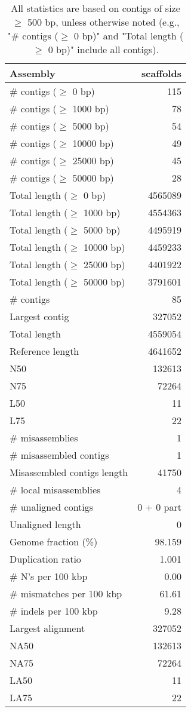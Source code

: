 \documentclass[12pt,a4paper]{article}
\begin{document}
\begin{table}[ht]
\begin{center}
\caption{All statistics are based on contigs of size $\geq$ 500 bp, unless otherwise noted (e.g., "\# contigs ($\geq$ 0 bp)" and "Total length ($\geq$ 0 bp)" include all contigs).}
\begin{tabular}{|l*{1}{|r}|}
\hline
Assembly & scaffolds \\ \hline
\# contigs ($\geq$ 0 bp) & 115 \\ \hline
\# contigs ($\geq$ 1000 bp) & 78 \\ \hline
\# contigs ($\geq$ 5000 bp) & 54 \\ \hline
\# contigs ($\geq$ 10000 bp) & 49 \\ \hline
\# contigs ($\geq$ 25000 bp) & 45 \\ \hline
\# contigs ($\geq$ 50000 bp) & 28 \\ \hline
Total length ($\geq$ 0 bp) & 4565089 \\ \hline
Total length ($\geq$ 1000 bp) & 4554363 \\ \hline
Total length ($\geq$ 5000 bp) & 4495919 \\ \hline
Total length ($\geq$ 10000 bp) & 4459233 \\ \hline
Total length ($\geq$ 25000 bp) & 4401922 \\ \hline
Total length ($\geq$ 50000 bp) & 3791601 \\ \hline
\# contigs & 85 \\ \hline
Largest contig & 327052 \\ \hline
Total length & 4559054 \\ \hline
Reference length & 4641652 \\ \hline
N50 & 132613 \\ \hline
N75 & 72264 \\ \hline
L50 & 11 \\ \hline
L75 & 22 \\ \hline
\# misassemblies & 1 \\ \hline
\# misassembled contigs & 1 \\ \hline
Misassembled contigs length & 41750 \\ \hline
\# local misassemblies & 4 \\ \hline
\# unaligned contigs & 0 + 0 part \\ \hline
Unaligned length & 0 \\ \hline
Genome fraction (\%) & 98.159 \\ \hline
Duplication ratio & 1.001 \\ \hline
\# N's per 100 kbp & 0.00 \\ \hline
\# mismatches per 100 kbp & 61.61 \\ \hline
\# indels per 100 kbp & 9.28 \\ \hline
Largest alignment & 327052 \\ \hline
NA50 & 132613 \\ \hline
NA75 & 72264 \\ \hline
LA50 & 11 \\ \hline
LA75 & 22 \\ \hline
\end{tabular}
\end{center}
\end{table}
\end{document}
